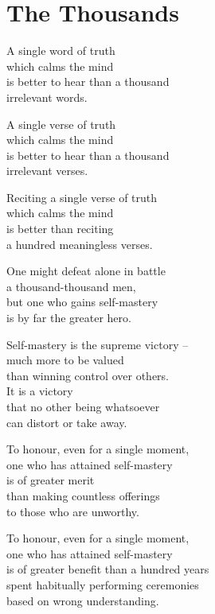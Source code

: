 
\chapter{The Thousands}


A single word of truth\\
which calms the mind\\
is better to hear than a thousand\\
irrelevant words.


A single verse of truth\\
which calms the mind\\
is better to hear than a thousand\\
irrelevant verses.


Reciting a single verse of truth\\
which calms the mind\\
is better than reciting\\
a hundred meaningless verses.


One might defeat alone in battle\\
a thousand-thousand men,\\
but one who gains self-mastery\\
is by far the greater hero.


Self-mastery is the supreme victory --\\
much more to be valued\\
than winning control over others.\\
It is a victory\\
that no other being whatsoever\\
can distort or take away.


To honour, even for a single moment,\\
one who has attained self-mastery\\
is of greater merit\\
than making countless offerings\\
to those who are unworthy.


To honour, even for a single moment,\\
one who has attained self-mastery\\
is of greater benefit than a hundred years\\
spent habitually performing ceremonies\\
based on wrong understanding.

